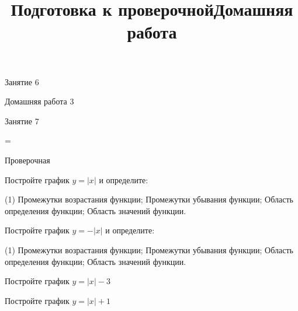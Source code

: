 \begin{class}[number=6]
	\begin{listofex}
		\item Занятие 6
	\end{listofex}
\end{class}

\begin{homework}[number=3]
	\begin{listofex}
		\item Домашняя работа 3
	\end{listofex}
\end{homework}

\begin{class}[number=7]
	\title{Подготовка к проверочной}
	\begin{listofex}
		\item Занятие 7
	\end{listofex}
\end{class}

=%
\begin{exam}
	\begin{listofex}
		\item Проверочная
	\end{listofex}
\end{exam}

\begin{consultation}
	\begin{listofex}
		\item Постройте график \( y=|x| \) и определите: 
		\begin{tasks}(1)
			\task Промежутки возрастания функции;
			\task Промежутки убывания функции;
			\task Область определения функции;
			\task Область значений функции.
		\end{tasks}
		\item Постройте график \( y=-|x| \) и определите: 
		\begin{tasks}(1)
			\task Промежутки возрастания функции;
			\task Промежутки убывания функции;
			\task Область определения функции;
			\task Область значений функции.
		\end{tasks}
		\item Постройте график \( y=|x|-3 \)
	\end{listofex}
	\newpage
	\title{Домашняя работа}
	\begin{listofex}
		\item Постройте график \( y=|x|+1 \)
	\end{listofex}
\end{consultation}
